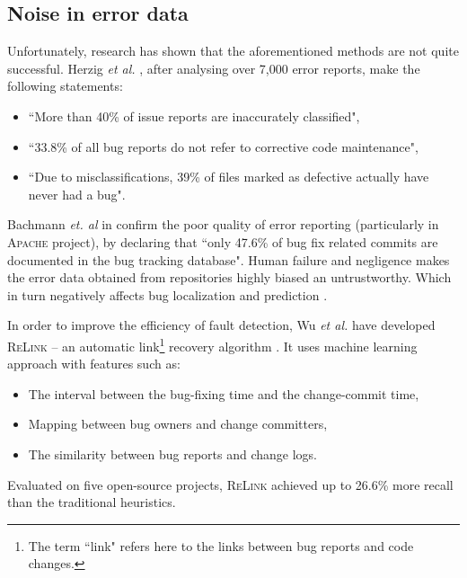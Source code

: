\documentclass{pracamgr}
\begin{document}
\subsection{Noise in error data}
\label{sec:noise}
Unfortunately, research has shown that the aforementioned methods are not quite successful. Herzig \textit{et al.} \cite{Herzig}, after analysing over 7,000 error reports, make the following statements:
\begin{itemize}
	\item ``More than 40\% of issue reports are inaccurately classified",
	\item ``33.8\% of all bug reports do not refer to corrective code maintenance",
	\item ``Due to misclassifications, 39\% of files marked as defective actually have never had a bug".
\end{itemize}
Bachmann \textit{et. al} in \cite{Bachmann} confirm the poor quality of error reporting (particularly in \textsc{Apache} project), by declaring that ``only 47.6\% of bug fix related commits are documented in the bug tracking database". Human failure and negligence makes the error data obtained from repositories highly biased an untrustworthy. Which in turn negatively affects bug localization and prediction \cites{Herzig, dealing, Kochnar}.

In order to improve the efficiency of fault detection, Wu \textit{et al.} have developed \textsc{ReLink} -- an automatic link\footnote{The term ``link" refers here to the links between bug reports and code changes.} recovery algorithm \cite{ReLink}. It uses machine learning approach with features such as:
\begin{itemize}
	\item The interval between the bug-fixing time and the change-commit time,
	\item Mapping between bug owners and change committers,
	\item The similarity between bug reports and change logs.
\end{itemize}
Evaluated on five open-source projects, \textsc{ReLink} achieved up to 26.6\% more recall than the traditional heuristics.
\end{document}
